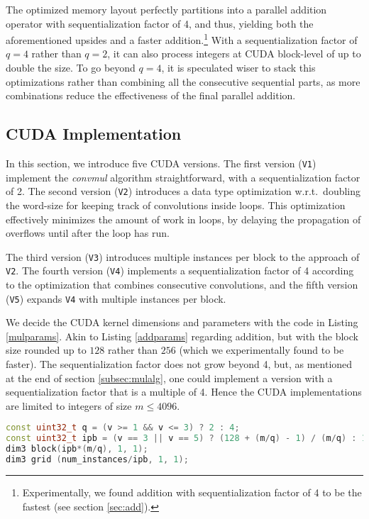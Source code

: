 The optimized memory layout perfectly partitions into a parallel addition
operator with sequentialization factor of 4, and thus, yielding both the
aforementioned upsides and a faster addition.\footnote{Experimentally, we found
  addition with sequentialization factor of 4 to be the fastest (see section
  \ref{sec:add}).}  With a sequentialization factor of $q=4$ rather than $q=2$,
it can also process integers at CUDA block-level of up to double the size. To go
beyond $q=4$, it is speculated wiser to stack this optimizations rather than
combining all the consecutive sequential parts, as more combinations reduce the
effectiveness of the final parallel addition.

\subsection{CUDA Implementation}
\label{subsec:mulcud}

In this section, we introduce five CUDA versions. The first version
(\texttt{V1}) implement the \textit{convmul} algorithm straightforward, with a
sequentialization factor of 2. The second version (\texttt{V2}) introduces a
data type optimization w.r.t.\ doubling the word-size for keeping track of
convolutions inside loops. This optimization effectively minimizes the amount of
work in loops, by delaying the propagation of overflows until after the loop
has run.

The third version (\texttt{V3}) introduces multiple instances per block to the
approach of \texttt{V2}. The fourth version (\texttt{V4}) implements a
sequentialization factor of 4 according to the optimization that combines
consecutive convolutions, and the fifth version (\texttt{V5}) expands
\texttt{V4} with multiple instances per block.

We decide the CUDA kernel dimensions and parameters with the code in Listing
\ref{mulparams}. Akin to Listing \ref{addparams} regarding addition, but with
the block size rounded up to $128$ rather than $256$ (which we experimentally
found to be faster). The sequentialization factor does not grow beyond 4, but,
as mentioned at the end of section \ref{subsec:mulalg}, one could implement a
version with a sequentialization factor that is a multiple of 4. Hence the CUDA
implementations are limited to integers of size $m\leq4096$.

\begin{lstlisting}[language=CPP,caption={\footnotesize CUDA multiplication parameters and dimensions for version $v$ with size $m$ and $num\_instances$.},label={mulparams}]
const uint32_t q = (v >= 1 && v <= 3) ? 2 : 4;
const uint32_t ipb = (v == 3 || v == 5) ? (128 + (m/q) - 1) / (m/q) : 1;
dim3 block(ipb*(m/q), 1, 1);
dim3 grid (num_instances/ipb, 1, 1);
\end{lstlisting}

